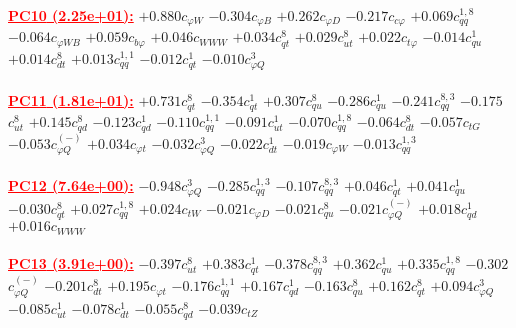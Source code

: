 \documentclass{article}
\begin{document}
\noindent \textcolor{red}{\underline{\bf{PC10} (2.25e+01):}}
{$+0.880$}{\rm $c_{\varphi W}$} 
{$-0.304$}{\rm $c_{\varphi B}$} 
{$+0.262$}{\rm $c_{\varphi D}$} 
{$-0.217$}{\rm $c_{c \varphi}$} 
{$+0.069$}{\rm $c_{qq}^{1,8}$} 
{$-0.064$}{\rm $c_{\varphi WB}$} 
{$+0.059$}{\rm $c_{b \varphi}$} 
{$+0.046$}{\rm $c_{WWW}$} 
{$+0.034$}{\rm $c_{qt}^{8}$} 
{$+0.029$}{\rm $c_{ut}^{8}$} 
{$+0.022$}{\rm $c_{t \varphi}$} 
{$-0.014$}{\rm $c_{qu}^{1}$} 
{$+0.014$}{\rm $c_{dt}^{8}$} 
{$+0.013$}{\rm $c_{qq}^{1,1}$} 
{$-0.012$}{\rm $c_{qt}^{1}$} 
{$-0.010$}{\rm $c_{\varphi Q}^{3}$} 
 \nonumber \\ \nonumber \\ 
\noindent \textcolor{red}{\underline{\bf{PC11} (1.81e+01):}}
{$+0.731$}{\rm $c_{qt}^{8}$} 
{$-0.354$}{\rm $c_{qt}^{1}$} 
{$+0.307$}{\rm $c_{qu}^{8}$} 
{$-0.286$}{\rm $c_{qu}^{1}$} 
{$-0.241$}{\rm $c_{qq}^{8,3}$} 
{$-0.175$}{\rm $c_{ut}^{8}$} 
{$+0.145$}{\rm $c_{qd}^{8}$} 
{$-0.123$}{\rm $c_{qd}^{1}$} 
{$-0.110$}{\rm $c_{qq}^{1,1}$} 
{$-0.091$}{\rm $c_{ut}^{1}$} 
{$-0.070$}{\rm $c_{qq}^{1,8}$} 
{$-0.064$}{\rm $c_{dt}^{8}$} 
{$-0.057$}{\rm $c_{tG}$} 
{$-0.053$}{\rm $c_{\varphi Q}^{(-)}$} 
{$+0.034$}{\rm $c_{\varphi t}$} 
{$-0.032$}{\rm $c_{\varphi Q}^{3}$} 
{$-0.022$}{\rm $c_{dt}^{1}$} 
{$-0.019$}{\rm $c_{\varphi W}$} 
{$-0.013$}{\rm $c_{qq}^{1,3}$} 
 \nonumber \\ \nonumber \\ 
\noindent \textcolor{red}{\underline{\bf{PC12} (7.64e+00):}}
{$-0.948$}{\rm $c_{\varphi Q}^{3}$} 
{$-0.285$}{\rm $c_{qq}^{1,3}$} 
{$-0.107$}{\rm $c_{qq}^{8,3}$} 
{$+0.046$}{\rm $c_{qt}^{1}$} 
{$+0.041$}{\rm $c_{qu}^{1}$} 
{$-0.030$}{\rm $c_{qt}^{8}$} 
{$+0.027$}{\rm $c_{qq}^{1,8}$} 
{$+0.024$}{\rm $c_{tW}$} 
{$-0.021$}{\rm $c_{\varphi D}$} 
{$-0.021$}{\rm $c_{qu}^{8}$} 
{$-0.021$}{\rm $c_{\varphi Q}^{(-)}$} 
{$+0.018$}{\rm $c_{qd}^{1}$} 
{$+0.016$}{\rm $c_{WWW}$} 
 \nonumber \\ \nonumber \\ 
\noindent \textcolor{red}{\underline{\bf{PC13} (3.91e+00):}}
{$-0.397$}{\rm $c_{ut}^{8}$} 
{$+0.383$}{\rm $c_{qt}^{1}$} 
{$-0.378$}{\rm $c_{qq}^{8,3}$} 
{$+0.362$}{\rm $c_{qu}^{1}$} 
{$+0.335$}{\rm $c_{qq}^{1,8}$} 
{$-0.302$}{\rm $c_{\varphi Q}^{(-)}$} 
{$-0.201$}{\rm $c_{dt}^{8}$} 
{$+0.195$}{\rm $c_{\varphi t}$} 
{$-0.176$}{\rm $c_{qq}^{1,1}$} 
{$+0.167$}{\rm $c_{qd}^{1}$} 
{$-0.163$}{\rm $c_{qu}^{8}$} 
{$+0.162$}{\rm $c_{qt}^{8}$} 
{$+0.094$}{\rm $c_{\varphi Q}^{3}$} 
{$-0.085$}{\rm $c_{ut}^{1}$} 
{$-0.078$}{\rm $c_{dt}^{1}$} 
{$-0.055$}{\rm $c_{qd}^{8}$} 
{$-0.039$}{\rm $c_{tZ}$} 
\end{document}
